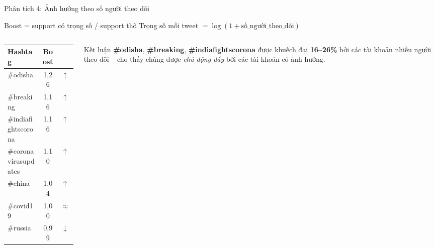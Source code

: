 \documentclass[aspectratio=169]{beamer}
\begin{document}
\begin{frame}{Phân tích 4: Ảnh hưởng theo số người theo dõi}
  \begin{block}{Boost = support có trọng số / support thô}
    Trọng số mỗi tweet $= \log(1 + \text{số\_người\_theo\_dõi})$
  \end{block}

  \vspace{0.3em}
  \begin{columns}[T]
    \begin{column}{0.52\textwidth}
      \begin{tabular}{lcc}
        \toprule
        \textbf{Hashtag} & \textbf{Boost} & \\
        \midrule
        \#odisha              & 1,26 & $\uparrow$ \\
        \#breaking            & 1,16 & $\uparrow$ \\
        \#indiafightscorona   & 1,16 & $\uparrow$ \\
        \#coronavirusupdates  & 1,10 & $\uparrow$ \\
        \#china               & 1,04 & $\uparrow$ \\
        \#covid19             & 1,00 & $\approx$ \\
        \#russia              & 0,99 & $\downarrow$ \\
        \bottomrule
      \end{tabular}
    \end{column}
    \begin{column}{0.44\textwidth}
      \begin{exampleblock}{Kết luận}
        \textbf{\#odisha}, \textbf{\#breaking}, \textbf{\#indiafightscorona} được khuếch đại \textbf{16--26\%} bởi các tài khoản nhiều người theo dõi -- cho thấy chúng được \textit{chủ động đẩy} bởi các tài khoản có ảnh hưởng.
      \end{exampleblock}
    \end{column}
  \end{columns}
\end{frame}
\end{document}
